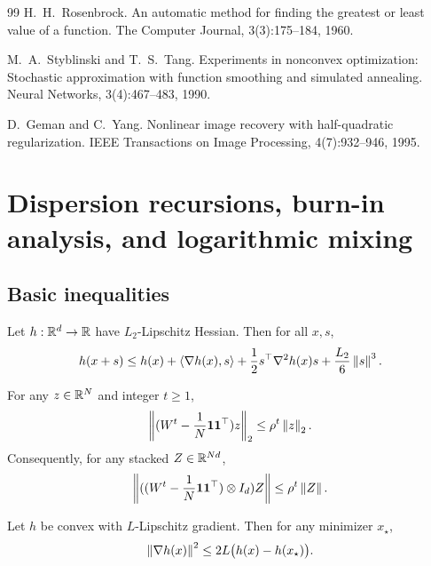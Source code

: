 \documentclass[review,onefignum,onetabnum]{siamart171218}
\begin{document}
\begin{thebibliography}{99}
		H.~H.~Rosenbrock.
		\newblock An automatic method for finding the greatest or least value of a function.
		\newblock The Computer Journal, 3(3):175--184, 1960.
		
		M.~A.~Styblinski and T.~S.~Tang.
		\newblock Experiments in nonconvex optimization: Stochastic approximation with function smoothing and simulated annealing.
		\newblock Neural Networks, 3(4):467--483, 1990.
		
		D.~Geman and C.~Yang.
		\newblock Nonlinear image recovery with half-quadratic regularization.
		\newblock IEEE Transactions on Image Processing, 4(7):932--946, 1995.
		
	\end{thebibliography}
	
	\appendix
	
	\section{Dispersion recursions, burn-in analysis, and logarithmic mixing}\label{app:dispersion}
	
	\subsection{Basic inequalities}\label{ssec:basic}
	\begin{lemma}\label{lem:taylor3}
		Let $h:\mathbb{R}^d\to\mathbb{R}$ have $L_2$-Lipschitz Hessian. Then for all $x,s$,
		\[
		h(x+s)\le h(x)+\left\langle \nabla h(x),s\right\rangle+\frac12 s^\top\nabla^2 h(x)s+\frac{L_2}{6}\left\|s\right\|^3.
		\]
	\end{lemma}
	
	\begin{lemma}\label{lem:consensus}
		For any $z\in\mathbb{R}^N$ and integer $t\ge 1$,
		\[
		\left\|(W^t-\frac{1}{N}\mathbf{1}\mathbf{1}^\top)z\right\|_2\le \rho^t\left\|z\right\|_2.
		\]
		Consequently, for any stacked $Z\in\mathbb{R}^{Nd}$,
		\[
		\left\|((W^t-\frac{1}{N}\mathbf{1}\mathbf{1}^\top)\otimes I_d)Z\right\|\le \rho^t\left\|Z\right\|.
		\]
	\end{lemma}
	
	\begin{lemma}\label{lem:gap-grad}
		Let $h$ be convex with $L$-Lipschitz gradient. Then for any minimizer $x_\star$,
		\[
		\left\|\nabla h(x)\right\|^2\le 2L\big(h(x)-h(x_\star)\big).
		\]
	\end{lemma}
	
\end{document}
